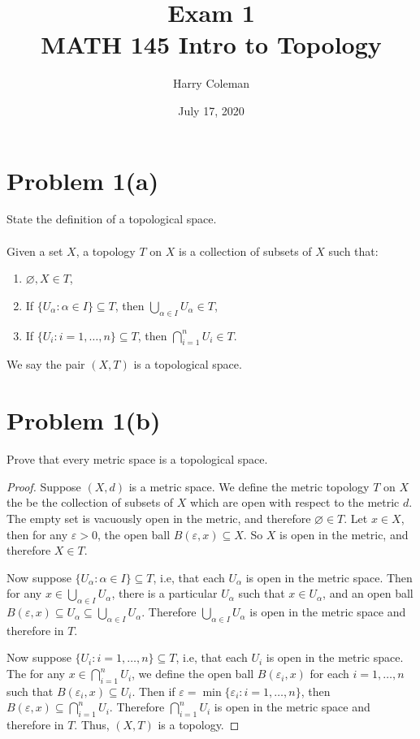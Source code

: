 \documentclass[12pt]{article}
\newenvironment{problem}
    {\begin{lrbox}{\mybox}\begin{minipage}{\textwidth-10pt}}
    {\end{minipage}\end{lrbox}\framebox[6.5in]{\usebox{\mybox}}}
\newenvironment{response}{\paragraph{}}{}
\let\eps\varepsilon
\let\emptyset\varnothing
\begin{document}
 
\title{Exam 1\\
    \large MATH 145 Intro to Topology
}
\author{Harry Coleman}
\date{July 17, 2020}
\maketitle

\section*{Problem 1(a)}
\begin{problem}
    State the definition of a topological space.
\end{problem}

\begin{response}
    Given a set $X$, a topology $T$ on $X$ is a collection of subsets of $X$ such that:
    \begin{enumerate}
        \item $\emptyset, X \in T$,
        \item If $\{U_\alpha : \alpha\in I\}\subseteq T$, then $\bigcup_{\alpha\in I}U_\alpha \in T$,
        \item If $\{U_i : i=1,\dots,n\}\subseteq T$, then $\bigcap_{i=1}^nU_i \in T$.
    \end{enumerate}
    We say the pair $(X,T)$ is a topological space.
\end{response}

\section*{Problem 1(b)}
\begin{problem}
    Prove that every metric space is a topological space.
\end{problem}

\begin{proof}
    Suppose $(X,d)$ is a metric space. We define the metric topology $T$ on $X$ the be the collection of subsets of $X$ which are open with respect to the metric $d$. The empty set is vacuously open in the metric, and therefore $\emptyset\in T$. Let $x\in X$, then for any $\eps>0$, the open ball $B(\eps, x)\subseteq X$. So $X$ is open in the metric, and therefore $X\in T$.
    
    Now suppose $\{U_\alpha : \alpha\in I\}\subseteq T$, i.e, that each $U_\alpha$ is open in the metric space. Then for any $x\in\bigcup_{\alpha\in I}U_\alpha$, there is a particular $U_\alpha$ such that $x\in U_\alpha$, and an open ball $B(\eps, x)\subseteq U_\alpha \subseteq \bigcup_{\alpha\in I}U_\alpha$. Therefore $\bigcup_{\alpha\in I}U_\alpha$ is open in the metric space and therefore in $T$.
    
    Now suppose $\{U_i : i=1,\dots,n\}\subseteq T$, i.e, that each $U_i$ is open in the metric space. The for any $x\in\bigcap_{i=1}^nU_i$, we define the open ball $B(\eps_i, x)$ for each $i=1,\dots,n$ such that $B(\eps_i, x)\subseteq U_i$. Then if $\eps = \min\{\eps_i : i=1,\dots,n\}$, then $B(\eps,x)\subseteq\bigcap_{i=1}^nU_i$. Therefore $\bigcap_{i=1}^nU_i$ is open in the metric space and therefore in $T$. Thus, $(X,T)$ is a topology.
    
\end{proof}
\end{document}
